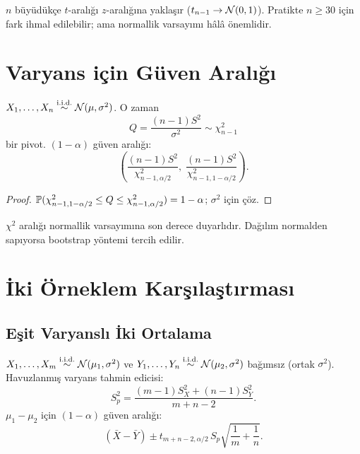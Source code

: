 \begin{kritiksorgu}
$n$ büyüdükçe $t$-aralığı $z$-aralığına yaklaşır ($t_{n-1}\to\mathcal{N}(0,1)$). Pratikte $n\geq30$ için fark ihmal edilebilir; ama normallik varsayımı hâlâ önemlidir.
\end{kritiksorgu}

\section{Varyans için Güven Aralığı}
\label{sec:varyans_ga}

\begin{teorem}\label{thm:chi2_ga}
$X_1,\ldots,X_n\overset{\text{i.i.d.}}{\sim}\mathcal{N}(\mu,\sigma^2)$. O zaman
\[
  Q = \frac{(n-1)S^2}{\sigma^2} \sim \chi^2_{n-1}
\]
bir pivot. $(1-\alpha)$ güven aralığı:
\[
  \left(\frac{(n-1)S^2}{\chi^2_{n-1,\alpha/2}},\; \frac{(n-1)S^2}{\chi^2_{n-1,1-\alpha/2}}\right).
\]
\end{teorem}

\begin{proof}
$\mathbb{P}(\chi^2_{n-1,1-\alpha/2}\leq Q\leq\chi^2_{n-1,\alpha/2})=1-\alpha$; $\sigma^2$ için çöz.
\end{proof}

\begin{hataanalizi}
$\chi^2$ aralığı normallik varsayımına son derece duyarlıdır. Dağılım normalden sapıyorsa bootstrap yöntemi tercih edilir.
\end{hataanalizi}

\section{İki Örneklem Karşılaştırması}
\label{sec:iki_orneklem}

\subsection{Eşit Varyanslı İki Ortalama}

\begin{teorem}\label{thm:iki_t}
$X_1,\ldots,X_m\overset{\text{i.i.d.}}{\sim}\mathcal{N}(\mu_1,\sigma^2)$ ve $Y_1,\ldots,Y_n\overset{\text{i.i.d.}}{\sim}\mathcal{N}(\mu_2,\sigma^2)$ bağımsız (ortak $\sigma^2$). Havuzlanmış varyans tahmin edicisi:
\[
  S_p^2 = \frac{(m-1)S_X^2+(n-1)S_Y^2}{m+n-2}.
\]
$\mu_1-\mu_2$ için $(1-\alpha)$ güven aralığı:
\[
  (\bar{X}-\bar{Y}) \pm t_{m+n-2,\alpha/2}\,S_p\!\sqrt{\frac{1}{m}+\frac{1}{n}}.
\]
\end{teorem}

